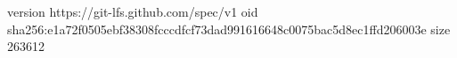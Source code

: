 version https://git-lfs.github.com/spec/v1
oid sha256:e1a72f0505ebf38308fcccdfcf73dad991616648c0075bac5d8ec1ffd206003e
size 263612
